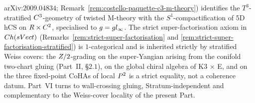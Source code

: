 arXiv:$2009.04834$; Remark~\ref{rem:costello-paquette-c3-m-theory})
identifies the $T^3$-stratified $C^3$-geometry of twisted M-theory with
the $S^1$-compactification of 5D hCS on $R \times C^2$, specialised
to $g = gl_\infty$. The strict super-factorisation
axiom in $Ch(sVect)$
(Remarks~\ref{rem:strict-super-factorisation} and
\ref{rem:strict-super-factorisation-stratified}) is $1$-categorical
and is inherited strictly by stratified Weiss covers: the
$Z/2$-grading on the super-Yangian arising from the conifold two-chart
gluing (Part~II, \S$2.1$), on the global chiral algebra of
K3 $\times$ E, and on the three fixed-point CoHAs of local $P^2$ is
a strict equality, not a coherence datum. Part~VI turns to
wall-crossing gluing, Stratum-independent and complementary to the
Weiss-cover locality of the present Part.
